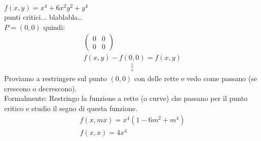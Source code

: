 \documentclass[a4paper, oneside]{article}
\begin{document}
        \begin{example}
            \hfil\\
    \begin{center}
    \end{center}
            $f(x,y) = x^4 +6x^2y^2+y^4$\\
            punti critici... blablabla\dots\\
            $P = (0,0)$ quindi:\\
            \begin{gather*}
                \begin{pmatrix}
                    0 & 0\\
                    0 & 0
                \end{pmatrix}\\
                f(x,y) - \underset{\underset{0}{||}}{f(0,0)} = f(x,y)
            \end{gather*}
            Proviamo a restringere sul punto $(0,0)$ con delle rette e vedo come passano (se crescono o decrescono).\\
            Formalmente: Restringo la funzione a rette (o curve) che passano per il punto critico e studio il segno di questa funzione.
            \begin{gather*}
                f(x,mx) = x^4(1-6m^2+m^4)\\
                f(x,x) = 4x^4
            \end{gather*}
        \end{example}
\end{document}
